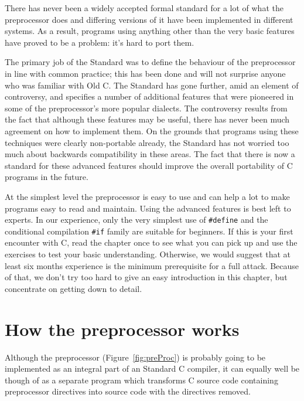    There has never been a widely accepted formal standard for a lot of
   what the preprocessor does and differing versions of it have been
   implemented in different systems. As a result, programs using anything
   other than the very basic features have proved to be a problem:
   it's hard to port them.


   The primary job of the Standard was to define the behaviour of the
   preprocessor in line with common practice; this has been done and will
   not surprise anyone who was familiar with Old C. The Standard has gone
   further, amid an element of controversy, and specifies a number of
   additional features that were pioneered in some of the preprocessor's
   more popular dialects. The controversy results from the fact that
   although these features may be useful, there has never been much
   agreement on how to implement them. On the grounds that programs using
   these techniques were clearly non-portable already, the Standard has not
   worried too much about backwards compatibility in these areas. The fact
   that there is now a standard for these advanced features should improve
   the overall portability of C programs in the future.


   At the simplest level the preprocessor is easy to use and can help
   a lot to make programs easy to read and maintain. Using the advanced
   features is best left to experts. In our experience, only the very
   simplest use of \texttt{\#define} and the conditional compilation
   \texttt{\#if} family are suitable for beginners. If this is your first
   encounter with C, read the chapter once to see what you can pick up and
   use the exercises to test your basic understanding. Otherwise, we would
   suggest that at least six months experience is the minimum prerequisite
   for a full attack. Because of that, we don't try too hard to give an easy
   introduction in this chapter, but concentrate on getting down to
   detail.


 
        \section{How the preprocessor works}
        

  

  Although the preprocessor (Figure~\ref{fig:preProc}) is probably going
   to be implemented as an integral part of an Standard C compiler, it can
   equally well be though of as a separate program which transforms C source
   code containing preprocessor directives into source code with the
   directives removed.


